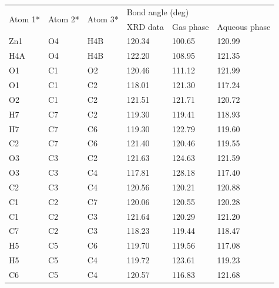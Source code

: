 \begin{table}[H]
\centering
\begin{tabular}{|l|l|l|lll|}
\hline
\multirow{2}{*}{Atom 1*} & \multirow{2}{*}{Atom 2*} & \multirow{2}{*}{Atom 3*} & \multicolumn{3}{l|}{Bond 				angle (deg)} \\ \cline{4-6} 
 &  &  & \multicolumn{1}{l|}{XRD data} & \multicolumn{1}{l|}{Gas phase} & Aqueous phase \\ \hline
Zn1 & O4 & H4B & \multicolumn{1}{l|}{120.34} & \multicolumn{1}{l|}{100.65} & 120.99 \\ \hline
H4A & O4 & H4B & \multicolumn{1}{l|}{122.20} & \multicolumn{1}{l|}{108.95} & 121.35 \\ \hline
O1 & C1 & O2 & \multicolumn{1}{l|}{120.46} & \multicolumn{1}{l|}{111.12} & 121.99 \\ \hline
O1 & C1 & C2 & \multicolumn{1}{l|}{118.01} & \multicolumn{1}{l|}{121.30} & 117.24 \\ \hline
O2 & C1 & C2 & \multicolumn{1}{l|}{121.51} & \multicolumn{1}{l|}{121.71} & 120.72 \\ \hline
H7 & C7 & C2 & \multicolumn{1}{l|}{119.30} & \multicolumn{1}{l|}{119.41} & 118.93 \\ \hline
H7 & C7 & C6 & \multicolumn{1}{l|}{119.30} & \multicolumn{1}{l|}{122.79} & 119.60 \\ \hline
C2 & C7 & C6 & \multicolumn{1}{l|}{121.40} & \multicolumn{1}{l|}{120.46} & 119.55 \\ \hline
O3 & C3 & C2 & \multicolumn{1}{l|}{121.63} & \multicolumn{1}{l|}{124.63} & 121.59 \\ \hline
O3 & C3 & C4 & \multicolumn{1}{l|}{117.81} & \multicolumn{1}{l|}{128.18} & 117.40 \\ \hline
C2 & C3 & C4 & \multicolumn{1}{l|}{120.56} & \multicolumn{1}{l|}{120.21} & 120.88 \\ \hline
C1 & C2 & C7 & \multicolumn{1}{l|}{120.06} & \multicolumn{1}{l|}{120.55} & 120.28 \\ \hline
C1 & C2 & C3 & \multicolumn{1}{l|}{121.64} & \multicolumn{1}{l|}{120.29} & 121.20 \\ \hline
C7 & C2 & C3 & \multicolumn{1}{l|}{118.23} & \multicolumn{1}{l|}{119.44} & 118.47 \\ \hline
H5 & C5 & C6 & \multicolumn{1}{l|}{119.70} & \multicolumn{1}{l|}{119.56} & 117.08 \\ \hline
H5 & C5 & C4 & \multicolumn{1}{l|}{119.72} & \multicolumn{1}{l|}{123.61} & 119.23 \\ \hline
C6 & C5 & C4 & \multicolumn{1}{l|}{120.57} & \multicolumn{1}{l|}{116.83} & 121.68 \\ \hline

\end{tabular}
\end{table}
